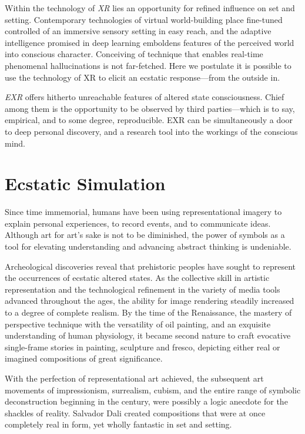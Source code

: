 \documentclass{UIdahoMastersThesis}
\begin{document}
Within the technology of \textit{\ac{XR}} lies an opportunity for refined influence on set and setting. Contemporary technologies of virtual world-building place fine-tuned controlled of an immersive sensory setting in easy reach, and the adaptive intelligence promised in deep learning emboldens features of the perceived world into conscious character. Conceiving of technique that enables real-time phenomenal hallucinations is not far-fetched. Here we postulate it is possible to use the technology of XR to elicit an ecstatic response---from the outside in.
 
\textit{\ac{EXR}} offers hitherto unreachable features of altered state consciousness. Chief among them is the opportunity to be observed by third parties---which is to say, empirical, and to some degree, reproducible. \ac{EXR} can be simultaneously a door to deep personal discovery, and a research tool into the workings of the conscious mind.


\section{Ecstatic Simulation}

Since time immemorial, humans have been using representational imagery to explain personal experiences, to record events, and to communicate ideas. Although art for art's sake is not to be diminished, the power of symbols as a tool for elevating understanding and advancing abstract thinking is undeniable.

Archeological discoveries reveal that prehistoric peoples have sought to represent the occurrences of ecstatic altered states. As the collective skill in artistic representation and the technological refinement in the variety of media tools advanced throughout the ages, the ability for image rendering steadily increased to a degree of complete realism. By the time of the Renaissance, the mastery of perspective technique with the versatility of oil painting, and an exquisite understanding of human physiology, it became second nature to craft evocative single-frame stories in painting, sculpture and fresco, depicting either real or imagined compositions of great significance.  

With the perfection of representational art achieved, the subsequent art movements of impressionism, surrealism, cubism, and the entire range of symbolic deconstruction beginning in the  century, were possibly a logic anecdote for the shackles of reality. Salvador Dali created compositions that were at once completely real in form, yet wholly fantastic in set and setting.
\end{document}
